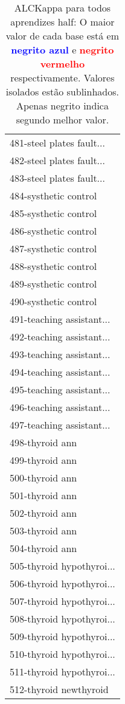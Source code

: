 \begin{table}[h]
\caption{ALCKappa para todos aprendizes half: O maior valor de cada base está em \textcolor{blue}{\textbf{negrito azul}} e \textcolor{red}{\textbf{negrito vermelho}} respectivamente. Valores isolados estão sublinhados. Apenas negrito indica segundo melhor valor.}
\begin{center}\begin{tabular}{l}
 & \\ \hline 481-steel plates fault... &  \\
482-steel plates fault... &  \\
483-steel plates fault... &  \\
484-systhetic control &  \\
485-systhetic control &  \\
486-systhetic control &  \\
487-systhetic control &  \\ \hline
488-systhetic control &  \\
489-systhetic control &  \\
490-systhetic control &  \\
491-teaching assistant... &  \\
492-teaching assistant... &  \\
493-teaching assistant... &  \\
494-teaching assistant... &  \\ \hline
495-teaching assistant... &  \\
496-teaching assistant... &  \\
497-teaching assistant... &  \\
498-thyroid ann &  \\
499-thyroid ann &  \\
500-thyroid ann &  \\
501-thyroid ann &  \\ \hline
502-thyroid ann &  \\
503-thyroid ann &  \\
504-thyroid ann &  \\
505-thyroid hypothyroi... &  \\
506-thyroid hypothyroi... &  \\
507-thyroid hypothyroi... &  \\
508-thyroid hypothyroi... &  \\ \hline
509-thyroid hypothyroi... &  \\
510-thyroid hypothyroi... &  \\
511-thyroid hypothyroi... &  \\
512-thyroid newthyroid &  \\\end{tabular}\label{stratsALCKappa15AllReduxHalfb}
\end{center}
\end{table}
